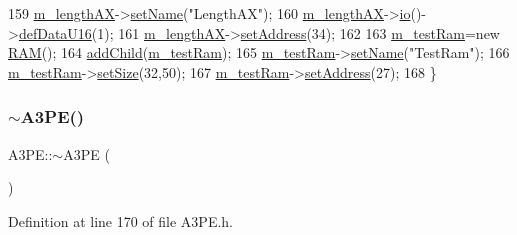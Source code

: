 \begin{DoxyCode}
159     \hyperlink{classA3PE_a87c93a38343873f2d52741deca4750ce}{m\_lengthAX}->\hyperlink{classObject_ae30fea75683c2d149b6b6d17c09ecd0c}{setName}(\textcolor{stringliteral}{"LengthAX"});
160     \hyperlink{classA3PE_a87c93a38343873f2d52741deca4750ce}{m\_lengthAX}->\hyperlink{classIOobject_af04fb94137c3d86849f478ac5afab5d1}{io}()->\hyperlink{classIOdata_a9e37c736d6dfb5223ed45786fad403da}{defDataU16}(1);
161     \hyperlink{classA3PE_a87c93a38343873f2d52741deca4750ce}{m\_lengthAX}->\hyperlink{classIOobject_ae0d372aaeafe3da3c239677118deb2ac}{setAddress}(34);
162 
163     \hyperlink{classA3PE_ad788e41ef5c674ab1a7671f3db0ffef6}{m\_testRam}=\textcolor{keyword}{new} \hyperlink{classRAM}{RAM}();
164     \hyperlink{classHierarchy_ad677774ff38fcb257c04a3a10d471fac}{addChild}(\hyperlink{classA3PE_ad788e41ef5c674ab1a7671f3db0ffef6}{m\_testRam});
165     \hyperlink{classA3PE_ad788e41ef5c674ab1a7671f3db0ffef6}{m\_testRam}->\hyperlink{classObject_ae30fea75683c2d149b6b6d17c09ecd0c}{setName}(\textcolor{stringliteral}{"TestRam"});
166     \hyperlink{classA3PE_ad788e41ef5c674ab1a7671f3db0ffef6}{m\_testRam}->\hyperlink{classRAM_adcf2ebb12f1a3e833ce7d5a33670c29d}{setSize}(32,50);
167     \hyperlink{classA3PE_ad788e41ef5c674ab1a7671f3db0ffef6}{m\_testRam}->\hyperlink{classIOobject_ae0d372aaeafe3da3c239677118deb2ac}{setAddress}(27);
168   \}
\end{DoxyCode}
\mbox{\label{classA3PE_aab155e065b455ff439daf47a976399c3}} 
\subsubsection{\texorpdfstring{$\sim$\+A3\+P\+E()}{~A3PE()}}
{\footnotesize\ttfamily A3\+P\+E\+::$\sim$\+A3\+PE (\begin{DoxyParamCaption}{ }\end{DoxyParamCaption})\hspace{0.3cm}{\ttfamily [inline]}}



Definition at line 170 of file A3\+P\+E.\+h.


